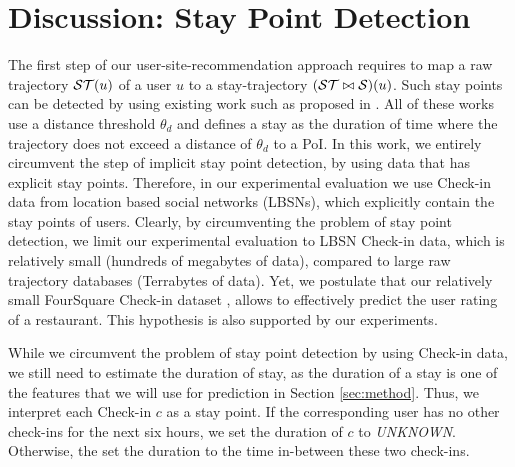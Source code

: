 \section{Discussion: Stay Point Detection} 
The first step of our user-site-recommendation approach requires to map a raw trajectory $\mathcal{ST}(u)$ of a user $u$ to a stay-trajectory $(\mathcal{ST}\bowtie\mathcal{S})(u)$. Such stay points can be detected by using existing work such as proposed in \cite{li2008mining,zheng2009mining,zheng2010geolife,xiao2010finding}. All of these works use a distance threshold $\theta_{d}$ and defines a stay as the duration of time where the trajectory does not exceed a distance of $\theta_{d}$ to a PoI. In this work, we entirely circumvent the step of implicit stay point detection, by using data that has explicit stay points. Therefore, in our experimental evaluation we use Check-in data from location based social networks (LBSNs), which explicitly contain the stay points of users. Clearly, by circumventing the problem of stay point detection, we limit our experimental evaluation to LBSN Check-in data, which is relatively small (hundreds of megabytes of data), compared to large raw trajectory databases (Terrabytes of data).
Yet, we postulate that our relatively small FourSquare Check-in dataset \cite{yang2014modeling}, allows to effectively predict the user rating of a restaurant. This hypothesis is also supported by our experiments.

While we circumvent the problem of stay point detection by using Check-in data, we still need to estimate the duration of stay, as the duration of a stay is one of the features that we will use for prediction in Section \ref{sec:method}. Thus, we interpret each Check-in $c$ as a stay point. If the corresponding user has no other check-ins for the next six hours, we set the duration of $c$ to \emph{UNKNOWN}. Otherwise, the set the duration to the time in-between these two check-ins.   